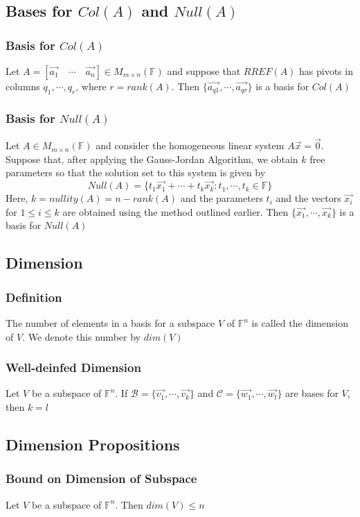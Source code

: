 \documentclass[12pt, letterpaper]{article}
\begin{document}
\subsection{Bases for $Col(A)$ and $Null(A)$}
\subsubsection{Basis for $Col(A)$}
Let $A=[\vec{a_1}\quad\cdots\quad\vec{a_n}]\in M_{m\times n}(\mathbb{F})$ and suppose that $RREF(A)$ has pivots in columns $q_1, \cdots, q_r$, where $r=rank(A)$. Then $\{\vec{a_{q1}},\cdots,\vec{a_{qr}}\}$ is a basis for $Col(A)$
\subsubsection{Basis for $Null(A)$}
Let $A\in M_{m\times n}(\mathbb{F})$ and consider the homogeneous linear system $A\vec{x}=\vec{0}$. 
Suppose that, after applying the Gauss-Jordan Algorithm, we obtain $k$ free parameters so that the solution set to
this system is given by
\[Null(A) = \{t_1\vec{x_1}+\cdots+t_k\vec{x_k}: t_1,\cdots,t_k\in\mathbb{F}\}\]
Here, $k=nullity(A)=n-rank(A)$ and the parameters $t_i$ and the vectors $\vec{x_i}$ for 
$1\leq i\leq k$ are obtained using the method outlined earlier. Then $\{\vec{x_1},\cdots, \vec{x_k}\}$
is a basis for $Null(A)$
\subsection{Dimension}
\subsubsection{Definition}
The number of elements in a basis for a subspace $V$ of $\mathbb{F}^n$ is called the 
dimension of $V$. We denote this number by $dim(V)$
\subsubsection{Well-deinfed Dimension}
Let $V$ be a subspace of $\mathbb{F}^n$. If $\mathcal{B} = \{\vec{v_1},\cdots,\vec{v_k}\}$ and 
$\mathcal{C} = \{\vec{w_1},\cdots,\vec{w_l}\}$ are bases for $V$, then $k=l$
\subsection{Dimension Propositions}
\subsubsection{Bound on Dimension of Subspace}
Let $V$ be a subspace of $\mathbb{F}^n$. Then $dim(V)\leq n$
\end{document}
